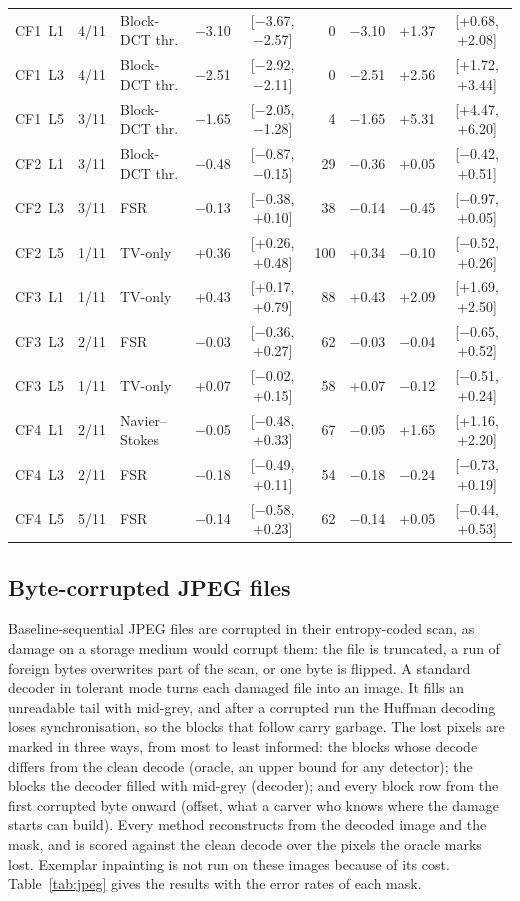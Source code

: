\documentclass[final,3p]{elsarticle}
\begin{document}
\begin{table}[!t]
\begin{tabular}{@{}l c l r c r r r c@{}}
CF1~L1 & 4/11 & Block-DCT thr. & $-$3.10 & [$-$3.67, $-$2.57] & 0 & $-$3.10 & +1.37 & [+0.68, +2.08] \\
CF1~L3 & 4/11 & Block-DCT thr. & $-$2.51 & [$-$2.92, $-$2.11] & 0 & $-$2.51 & +2.56 & [+1.72, +3.44] \\
CF1~L5 & 3/11 & Block-DCT thr. & $-$1.65 & [$-$2.05, $-$1.28] & 4 & $-$1.65 & +5.31 & [+4.47, +6.20] \\
\midrule
CF2~L1 & 3/11 & Block-DCT thr. & $-$0.48 & [$-$0.87, $-$0.15] & 29 & $-$0.36 & +0.05 & [$-$0.42, +0.51] \\
CF2~L3 & 3/11 & FSR & $-$0.13 & [$-$0.38, +0.10] & 38 & $-$0.14 & $-$0.45 & [$-$0.97, +0.05] \\
CF2~L5 & 1/11 & TV-only & +0.36 & [+0.26, +0.48] & 100 & +0.34 & $-$0.10 & [$-$0.52, +0.26] \\
\midrule
CF3~L1 & 1/11 & TV-only & +0.43 & [+0.17, +0.79] & 88 & +0.43 & +2.09 & [+1.69, +2.50] \\
CF3~L3 & 2/11 & FSR & $-$0.03 & [$-$0.36, +0.27] & 62 & $-$0.03 & $-$0.04 & [$-$0.65, +0.52] \\
CF3~L5 & 1/11 & TV-only & +0.07 & [$-$0.02, +0.15] & 58 & +0.07 & $-$0.12 & [$-$0.51, +0.24] \\
\midrule
CF4~L1 & 2/11 & Navier--Stokes & $-$0.05 & [$-$0.48, +0.33] & 67 & $-$0.05 & +1.65 & [+1.16, +2.20] \\
CF4~L3 & 2/11 & FSR & $-$0.18 & [$-$0.49, +0.11] & 54 & $-$0.18 & $-$0.24 & [$-$0.73, +0.19] \\
CF4~L5 & 5/11 & FSR & $-$0.14 & [$-$0.58, +0.23] & 62 & $-$0.14 & +0.05 & [$-$0.44, +0.53] \\
\bottomrule
\end{tabular}
\end{table}

\subsection{Byte-corrupted JPEG files}
\label{sec:results:jpeg}

Baseline-sequential JPEG files are corrupted in their entropy-coded scan, as damage on a storage medium would corrupt them: the file is truncated, a run of foreign bytes overwrites part of the scan, or one byte is flipped. A standard decoder in tolerant mode turns each damaged file into an image. It fills an unreadable tail with mid-grey, and after a corrupted run the Huffman decoding loses synchronisation, so the blocks that follow carry garbage. The lost pixels are marked in three ways, from most to least informed: the blocks whose decode differs from the clean decode (oracle, an upper bound for any detector); the blocks the decoder filled with mid-grey (decoder); and every block row from the first corrupted byte onward (offset, what a carver who knows where the damage starts can build). Every method reconstructs from the decoded image and the mask, and is scored against the clean decode over the pixels the oracle marks lost. Exemplar inpainting is not run on these images because of its cost. Table~\ref{tab:jpeg} gives the results with the error rates of each mask.
\end{document}
